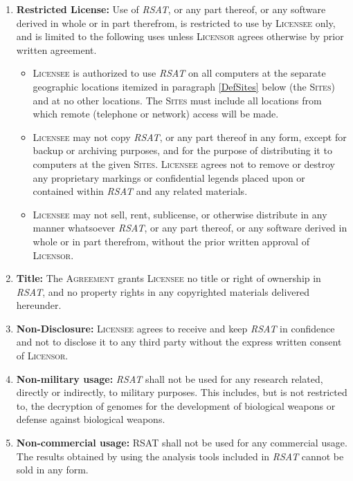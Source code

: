 \documentclass[12pt]{article}
\newcommand{\RSAT}[0]{\emph{RSAT}\xspace}
\newcommand{\Licensor}[0]{\textsc{Licensor}\xspace}
\newcommand{\Licensee}[0]{\textsc{Licensee}\xspace}
\newcommand{\Agreement}[0]{\textsc{Agreement}\xspace}
\newcommand{\Sites}[0]{\textsc{Sites}\xspace}
\newcommand{\Paragraph}[2]{\item \textbf{#1:} #2}
\begin{document}
\begin{enumerate}

\Paragraph{Restricted License}{Use of \RSAT, or any part 
thereof, or any software derived in whole or in part therefrom, is
restricted to use by \Licensee only, and is limited to the following
uses unless \Licensor agrees otherwise by prior written agreement.  }

\begin{itemize}

\item \Licensee is authorized to use \RSAT on all computers at the
separate geographic locations itemized in paragraph \ref{DefSites}
below (the \Sites) and at no other locations. The \Sites must include
all locations from which remote (telephone or network) access will be
made.

\item \Licensee may not copy \RSAT, or any part thereof in any form,
except for backup or archiving purposes, and for the purpose of
distributing it to computers at the given \Sites. \Licensee agrees not
to remove or destroy any proprietary markings or confidential legends
placed upon or contained within \RSAT and any related materials.

\item \Licensee may not sell, rent, sublicense, or otherwise
distribute in any manner whatsoever \RSAT, or any part thereof, or any
software derived in whole or in part therefrom, without the prior
written approval of \Licensor.
\end{itemize}

\Paragraph{Title}{The \Agreement grants \Licensee no title or right of 
ownership in \RSAT, and no property rights in any 
copyrighted materials delivered hereunder.
}

\Paragraph{Non-Disclosure}{\Licensee agrees to receive and keep 
\RSAT in confidence and not to disclose it to any third 
party without the express written consent of \Licensor.
}

\Paragraph{Non-military usage} {\RSAT shall not be used for any research 
related, directly or indirectly, to military purposes. This includes,
but is not restricted to, the decryption of genomes for the
development of biological weapons or defense against biological
weapons.  }

\Paragraph{Non-commercial usage} {RSAT shall not be used for any commercial 
usage. The results obtained by using the analysis tools included in
\RSAT cannot be sold in any form.
}


\end{enumerate}
\end{document}
